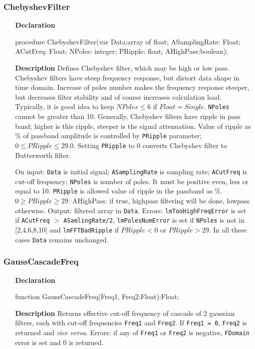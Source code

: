 \documentclass[12pt,a4paper,oneside]{report}
\newcommand{\declarationitem}[1]{\textbf{#1}}
\newcommand{\descriptiontitle}[1]{\textbf{#1}}
\newcommand{\code}[1]{\texttt{#1}}
\begin{document}
\subsubsection{ChebyshevFilter}
\label{chebyshevfilter}
\begin{itemize}
	\item[\declarationitem{Declaration}\hfill]
	\begin{flushleft}
		procedure ChebyshevFilter(var Data:array of float; ASamplingRate: Float; ACutFreq: Float;
		NPoles: integer; PRipple: float; AHighPass:boolean);
	\end{flushleft}
	\item[\descriptiontitle{Description}]
	Defines Chebyshev filter, which may be high or low pass. Chebyshev filters have steep frequency response, but distort data shape in time domain. Increase of poles number makes the frequency response steeper, but decreases filter stability and of course increases calculation load. Typically, it is good idea to keep $NPoles \leq 6$ if $Float = Single$. \code{NPoles} cannot be greater than 10. Generally, Chebyshev filters have ripple in pass band; higher is this ripple, steeper is the signal attenuation. Value of ripple as \%{} of passband amplitude is controlled by \code{PRipple} parameter; $0 \leq PRipple \leq 29.0$. Setting \code{PRipple} to 0 converts Chebyshev filter to Butterworth filter. 
	
	On input: \code{Data} is initial signal; \code{ASamplingRate} is sampling rate; \code{ACutFreq} is cut-off frequency; \code{NPoles} is number of poles. It must be positive even, less or equal to 10. \code{PRipple} is allowed value of ripple	in the passband as \%. $0 \geq PRipple\geq 29$. AHighPass: if true, highpass filtering will be done, lowpass otherwise. Output: filtered array in \code{Data}. Errors: \code{lmTooHighFreqError} is set if \code{ACutFreq} $>$ \code{ASamlingRate/2}, \code{lmPolesNumError} is set if \code{NPoles} is not in [2,4,6,8,10] and \code{lmFFTBadRipple} if $PRipple < 0$ or $PRipple > 29$. In all these cases \code{Data} remains unchanged.  
\end{itemize}	

\subsubsection{GaussCascadeFreq}
\label{ufilters-gausscascadefreq}
\begin{itemize}
	\item[\declarationitem{Declaration}\hfill]
	\begin{flushleft}
		function GaussCascadeFreq(Freq1, Freq2:Float):Float;	
	\end{flushleft}
	\item[\descriptiontitle{Description}]
	Returns effective cut-off frequency of cascade of 2 gaussian filters, each with cut-off frequencies \code{Freq1} and \code{Freq2}. If \code{Freq1 = 0}, \code{Freq2} is returned and \textit{vice versa}. Errors: if any of \code{Freq1} or \code{Freq2} is negative, \code{FDomain} error is set and 0 is returned.
\end{itemize}	
\end{document}

